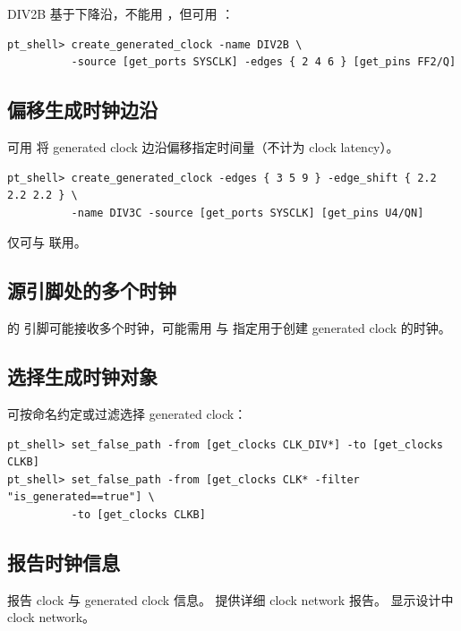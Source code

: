 DIV2B 基于下降沿，不能用 ，但可用 ：
\begin{lstlisting}
pt_shell> create_generated_clock -name DIV2B \
          -source [get_ports SYSCLK] -edges { 2 4 6 } [get_pins FF2/Q]
\end{lstlisting}

\subsection{偏移生成时钟边沿}
可用  将 generated clock 边沿偏移指定时间量（不计为 clock latency）。


\begin{lstlisting}
pt_shell> create_generated_clock -edges { 3 5 9 } -edge_shift { 2.2 2.2 2.2 } \
          -name DIV3C -source [get_ports SYSCLK] [get_pins U4/QN]
\end{lstlisting}

\begin{noteBox}
 仅可与  联用。
\end{noteBox}

\subsection{源引脚处的多个时钟}
 的  引脚可能接收多个时钟，可能需用  与  指定用于创建 generated clock 的时钟。

\subsection{选择生成时钟对象}
 可按命名约定或过滤选择 generated clock：
\begin{lstlisting}
pt_shell> set_false_path -from [get_clocks CLK_DIV*] -to [get_clocks CLKB]
pt_shell> set_false_path -from [get_clocks CLK* -filter "is_generated==true"] \
          -to [get_clocks CLKB]
\end{lstlisting}

\subsection{报告时钟信息}
 报告 clock 与 generated clock 信息。 提供详细 clock network 报告。 显示设计中 clock network。

